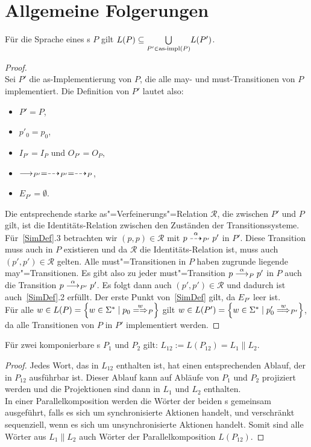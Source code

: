 \section{Allgemeine Folgerungen}
\label{saetzeKapitel}

\begin{Prop}
  \label{LImpProp}
  Für die Sprache eines \MEIO{}s $P$ gilt $L(P) \subseteq \underset{P'\in\mathrm{as}\text{-}\mathrm{impl}
  (P)}{\bigcup} L(P')$.
\end{Prop}
\begin{proof}\mbox{}\\
  Sei $P'$ die as-Implementierung von $P$, die alle may- und must-Transitionen
  von $P$ implementiert. Die Definition von $P'$ lautet also:
  \begin{itemize}
    \item $P'=P$,
    \item $p'_0=p_0$,
    \item $I_{P'}=I_P$ und $O_{P'}=O_P$,
    \item $\must _{P'} =\may _{P'} = \may _P$,
    \item $E_{P'}=\emptyset$.
  \end{itemize}
  Die entsprechende starke as"=Verfeinerungs"=Relation $\mathcal{R}$, die
  zwischen $P'$ und $P$ gilt, ist die Identitäts-Relation zwischen den
  Zuständen der Transitionssysteme. Für~\ref{SimDef}.3 betrachten wir $(p,p)
  \in\mathcal{R}$ mit $p\may[\alpha]_{P'} p'$ in $P'$. Diese Transition muss
  auch in $P$ existieren und da $\mathcal{R}$ die Identitäts-Relation ist, muss
  auch $(p',p')\in\mathcal{R}$ gelten. Alle must"=Transitionen in $P$ haben
  zugrunde liegende may"=Transitionen. Es gibt also zu jeder must"=Transition
  $p \must[\alpha]_P p'$ in $P$ auch die Transition $p\must[\alpha]_{P'} p'$.
  Es folgt dann auch $(p',p') \in \mathcal{R}$ und dadurch ist
  auch~\ref{SimDef}.2 erfüllt. Der erste Punkt von~\ref{SimDef} gilt, da
  $E_{P'}$ leer ist.\\
  Für alle $w\in L(P) = \left\{w\in \Sigma ^* \mid p_0\weakmay[w]_P\right\}$
  gilt $w\in L(P') = \left\{w\in \Sigma ^* \mid p'_0 \weakmust[w]_{P'}
  \right\}$, da alle Transitionen von $P$ in $P'$ implementiert werden.
\end{proof}

\begin{Prop}
  \label{LParallelProp}
  Für zwei komponierbare \MEIO{}s $P_1$ und $P_2$ gilt: $L_{12} := L(P_{12}) =
  L_1\|L_2$.
\end{Prop}
\begin{proof}
  Jedes Wort, das in $L_{12}$ enthalten ist, hat einen entsprechenden Ablauf,
  der in $P_{12}$ ausführbar ist. Dieser Ablauf kann auf Abläufe von $P_1$ und
  $P_2$ projiziert werden und die Projektionen sind dann in $L_1$ und $L_2$
  enthalten.\\
  In einer Parallelkomposition werden die Wörter der beiden \MEIO{}s gemeinsam
  ausgeführt, falls es sich um synchronisierte Aktionen handelt, und
  verschränkt sequenziell, wenn es sich um unsynchronisierte Aktionen handelt.
  Somit sind alle Wörter aus $L_1\|L_2$ auch Wörter der Parallelkomposition
  $L(P_{12})$.
\end{proof}

